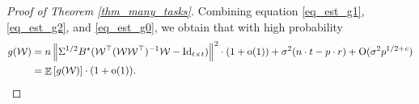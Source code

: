 \begin{proof}[Proof of Theorem \ref{thm_many_tasks}]
	Combining equation \eqref{eq_est_g1}, \eqref{eq_est_g2}, and \eqref{eq_est_g0}, we obtain that with high probability
	\begin{align*}
	g(\mathcal W)&= n \left\| \Sigma^{1/2} B^{\star} ({\mathcal W}^{\top} ({\mathcal W} {\mathcal W}^{\top})^{-1} {\mathcal W} - \operatorname{Id}_{t\times t}) \right\|^2 \cdot (1+\operatorname{o}(1)) + \sigma^2 (n\cdot t - p \cdot r)+\operatorname{O}(\sigma^2 p^{1/2+{\mathit{c}}})\\
	&=\mathop{\mathbb{E}}\left[ g({\mathcal W}) \right] \cdot (1+\operatorname{o}(1)).
	\end{align*}

	



\end{proof}
